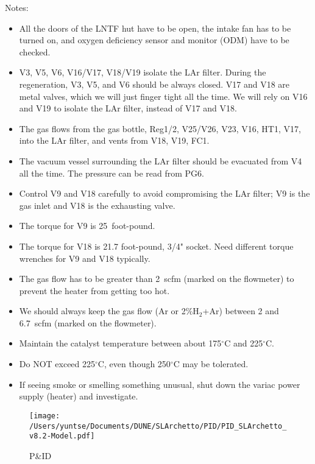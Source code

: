 \documentclass[letterpaper,11pt]{article}
\newcommand{\Hydro}     {H$_2$}
\newcommand{\dC}        {$^\circ$C}
\begin{document}
Notes:
\begin{itemize}
\setlength\itemsep{-0.2em}
\item All the doors of the LNTF hut have to be open, the intake fan has to be turned on, and oxygen deficiency sensor and monitor (ODM) have to be checked.
\item V3, V5, V6, V16/V17, V18/V19 isolate the LAr filter.  During the regeneration, V3, V5, and V6 should be always closed.  V17 and V18 are metal valves, which we will just finger tight all the time.  We will rely on V16 and V19 to isolate the LAr filter, instead of V17 and V18.
\item The gas flows from the gas bottle, Reg1/2, V25/V26, V23, V16, HT1, V17, into the LAr filter, and vents from V18, V19, FC1.
\item The vacuum vessel surrounding the LAr filter should be evacuated from V4 all the time.  The pressure can be read from PG6.
\item Control V9 and V18 carefully to avoid compromising the LAr filter; V9 is the gas inlet and V18 is the exhausting valve.
\item The torque for V9 is 25~foot-pound.
\item The torque for V18 is 21.7 foot-pound, 3/4" socket.  Need different torque wrenches for V9 and V18 typically.
\item The gas flow has to be greater than 2~scfm (marked on the flowmeter) to prevent the heater from getting too hot.
\item We should always keep the gas flow (Ar or 2\%{\Hydro}+Ar) between 2 and 6.7~scfm (marked on the flowmeter).
\item Maintain the catalyst temperature between about 175{\dC} and
225{\dC}.
\item Do NOT exceed 225{\dC}, even though 250{\dC} may be tolerated.
\item If seeing smoke or smelling something unusual, shut down the variac power supply (heater) and investigate.
\end{itemize}

\clearpage
\begin{figure}[htb]
\begin{center}
\texttt{[image: /Users/yuntse/Documents/DUNE/SLArchetto/PID/PID\_SLArchetto\_v8.2-Model.pdf]}
\caption{P\&ID}
\end{center}
\end{figure}
\end{document}
